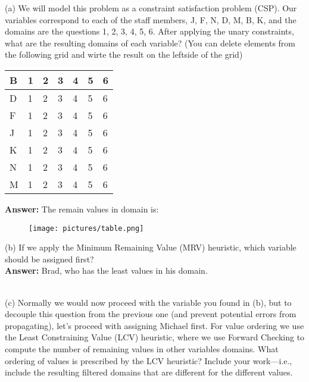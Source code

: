 \documentclass{article}
\begin{document}
\noindent (a) We will model this problem as a constraint satisfaction problem (CSP). Our variables correspond to each of the staff members, J, F, N, D, M, B, K, and the domains are the questions 1, 2, 3, 4, 5, 6. After applying the unary constraints, what are the resulting domains of each variable? (You can delete elements from the following grid and wirte the result on the leftside of the grid)

\renewcommand\arraystretch{1.5}
\begin{table}[tbh!]
\begin{center}
    \begin{tabular}{|p{0.5cm}| p{0.5cm}| p{0.5cm} | p{0.5cm}| p{0.5cm}| p{0.5cm}| p{0.5cm}|}
\hline
    B & 1 & 2 & 3 & 4 & 5 & 6  \\ \hline
    D & 1 & 2 & 3 & 4 & 5 & 6  \\ \hline
    F & 1 & 2 & 3 & 4 & 5 & 6  \\ \hline
    J & 1 & 2 & 3 & 4 & 5 & 6  \\ \hline
    K & 1 & 2 & 3 & 4 & 5 & 6  \\ \hline
    N & 1 & 2 & 3 & 4 & 5 & 6  \\ \hline
    M & 1 & 2 & 3 & 4 & 5 & 6  \\ \hline
\end{tabular}
\end{center}
\end{table}

\textbf{Answer:} The remain values in domain is:

\begin{figure}[h]
\centering
\texttt{[image: pictures/table.png]}
\end{figure}


\noindent (b) If we apply the Minimum Remaining Value (MRV) heuristic, which variable should be assigned first? \\

\textbf{Answer:}  Brad, who has the least values in his domain.

~\\

\noindent (c) Normally we would now proceed with the variable you found in (b), but to decouple this question from the previous one (and prevent potential errors from propagating), let’s proceed with assigning Michael first. For value ordering we use the Least Constraining Value (LCV) heuristic, where we use Forward Checking to compute the number of remaining values in other variables domains. What ordering of values is prescribed by the LCV heuristic? Include your work—i.e., include the resulting filtered domains that are different for the different values.\\
\end{document}

